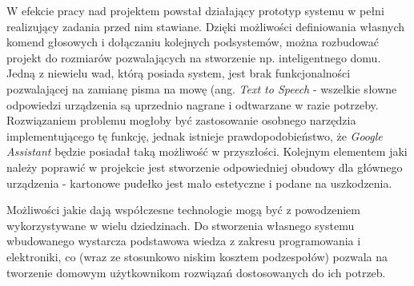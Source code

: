 W efekcie pracy nad projektem powstał działający prototyp systemu w pełni realizujący zadania przed nim stawiane. Dzięki możliwości definiowania własnych komend głosowych i dołączaniu kolejnych podsystemów, można rozbudować projekt do rozmiarów pozwalających na stworzenie np. inteligentnego domu. Jedną z niewielu wad, którą posiada system, jest brak funkcjonalności pozwalającej na zamianę pisma na mowę (ang. \emph{Text to Speech} - wszelkie słowne odpowiedzi urządzenia są uprzednio nagrane i odtwarzane w razie potrzeby. Rozwiązaniem problemu mogłoby być zastosowanie osobnego narzędzia implementującego tę funkcję, jednak istnieje prawdopodobieństwo, że \emph{Google Assistant} będzie posiadał taką możliwość w przyszłości. Kolejnym elementem jaki należy poprawić w projekcie jest stworzenie odpowiedniej obudowy dla głównego urządzenia - kartonowe pudełko jest mało estetyczne i podane na uszkodzenia.

Możliwości jakie dają współczesne technologie mogą być z powodzeniem wykorzystywane w wielu dziedzinach. Do stworzenia własnego systemu wbudowanego wystarcza podstawowa wiedza z zakresu programowania i elektroniki, co (wraz ze stosunkowo niskim kosztem podzespołów) pozwala na tworzenie domowym użytkownikom rozwiązań dostosowanych do ich potrzeb.  